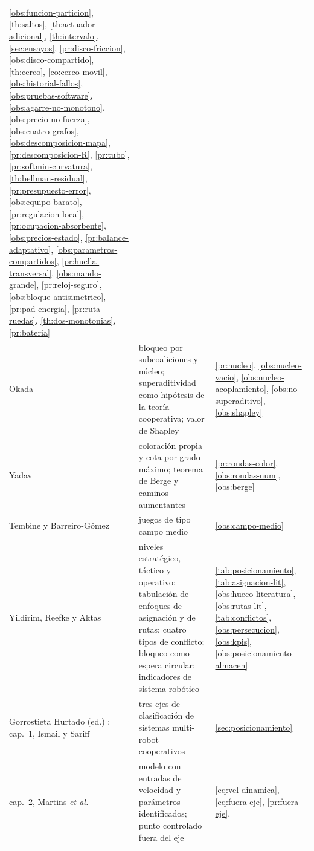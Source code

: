 \begin{table}[!ht]
\begin{tabularx}{\textwidth}{@{}p{4.6cm}p{3.5cm}X@{}}
    \cref{obs:funcion-particion}, \cref{th:saltos},
    \cref{th:actuador-adicional}, \cref{th:intervalo},
    \cref{sec:ensayos}, \cref{pr:disco-friccion},
    \cref{obs:disco-compartido}, \cref{th:cerco}, \cref{co:cerco-movil},
    \cref{obs:historial-fallos}, \cref{obs:pruebas-software},
    \cref{obs:agarre-no-monotono}, \cref{obs:precio-no-fuerza},
    \cref{obs:cuatro-grafos}, \cref{obs:descomposicion-mapa},
    \cref{pr:descomposicion-R}, \cref{pr:tubo}, \cref{pr:softmin-curvatura},
    \cref{th:bellman-residual}, \cref{pr:presupuesto-error},
    \cref{obs:equipo-barato}, \cref{pr:regulacion-local},
    \cref{pr:ocupacion-absorbente}, \cref{obs:precios-estado},
    \cref{pr:balance-adaptativo}, \cref{obs:parametros-compartidos},
    \cref{pr:huella-transversal}, \cref{obs:mando-grande},
    \cref{pr:reloj-seguro}, \cref{obs:bloque-antisimetrico},
    \cref{pr:pad-energia}, \cref{pr:ruta-ruedas}, \cref{th:dos-monotonias},
    \cref{pr:bateria} \\
Okada \cite{okada2026games}
  & bloqueo por subcoaliciones y núcleo; superaditividad como hipótesis de la
    teoría cooperativa; valor de Shapley
  & \cref{pr:nucleo}, \cref{obs:nucleo-vacio},
    \cref{obs:nucleo-acoplamiento}, \cref{obs:no-superaditivo},
    \cref{obs:shapley} \\
Yadav \cite{yadav2023advanced}
  & coloración propia y cota por grado máximo; teorema de Berge y caminos
    aumentantes
  & \cref{pr:rondas-color}, \cref{obs:rondas-num}, \cref{obs:berge} \\
Tembine y Barreiro-Gómez \cite{tembine2021meanfield}
  & juegos de tipo campo medio
  & \cref{obs:campo-medio} \\
Yildirim, Reefke y Aktas \cite{yildirim2023warehouse}
  & niveles estratégico, táctico y operativo; tabulación de enfoques de
    asignación y de rutas; cuatro tipos de conflicto; bloqueo como espera
    circular; indicadores de sistema robótico
  & \cref{tab:posicionamiento}, \cref{tab:asignacion-lit},
    \cref{obs:hueco-literatura}, \cref{obs:rutas-lit},
    \cref{tab:conflictos}, \cref{obs:persecucion}, \cref{obs:kpis},
    \cref{obs:posicionamiento-almacen} \\
Gorrostieta Hurtado (ed.) \cite{gorrostieta2019applications}:
  cap.~1, Ismail y Sariff
  & tres ejes de clasificación de sistemas multi-robot cooperativos
  & \cref{sec:posicionamiento} \\
\quad cap.~2, Martins \emph{et al.}
  & modelo con entradas de velocidad y parámetros identificados; punto
    controlado fuera del eje
  & \eqref{eq:vel-dinamica}, \eqref{eq:fuera-eje}, \cref{pr:fuera-eje},

\end{tabularx}
\end{table}
